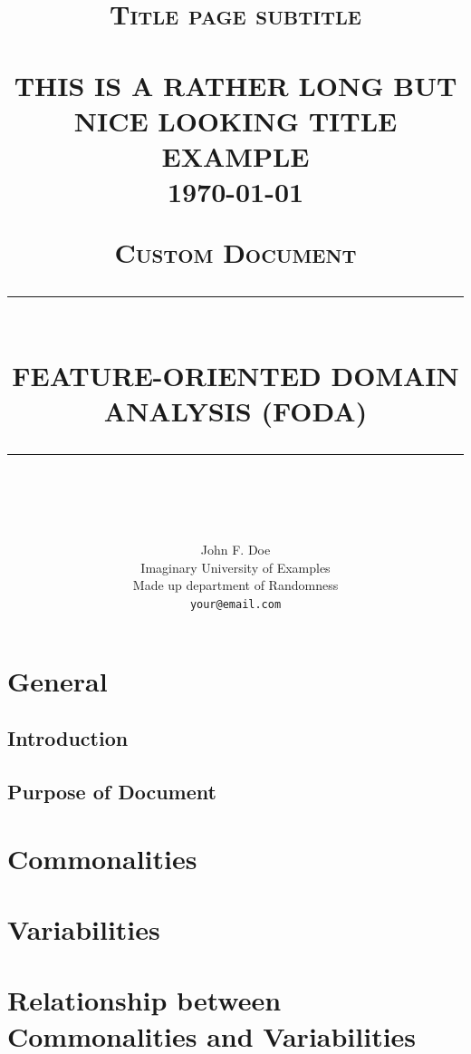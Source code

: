 \documentclass[12pt, titlepage] {article}
\title{	\normalsize \textsc{Title page subtitle} 	%
		 	\\[2.0cm]								%
			\HRule{0.5pt} \\						%
			\LARGE \textbf{\uppercase{This is a rather long but nice looking title example}}	%
			\HRule{2pt} \\ [0.5cm]		%
			\normalsize \today			%
		}
\author{
		John F. Doe\\	
		Imaginary University of Examples\\	
		Made up department of Randomness\\
        \texttt{your@email.com} \\
}
\newcommand{\HRule}[1]{\rule{\linewidth}{#1}} 	%
\newcounter{com}
\begin{document}
\title{	\normalsize \textsc{Custom Document} 	%
    \\[2.0cm]								%
    \HRule{0.5pt} \\						%
    \LARGE \textbf{\uppercase{Feature-Oriented Domain Analysis (FODA)}}	%
    \HRule{2pt} \\ [0.5cm]		%
}
\author{\authname}
\thispagestyle{empty}		%


\maketitle


\tableofcontents
\listoftables

\setcounter{page}{1}		%

\newpage


\newpage{}




\newpage{}
\setcounter{page}{1}		%
\section{General}

\subsection{Introduction}

\subsection{Purpose of Document}


\newpage{}
\section{Commonalities}
\label{sec:Commonalities}


\newpage{}
\section{Variabilities}
\label{sec:Variabilities}


\newpage{}
\section{Relationship between Commonalities and Variabilities}
\label{sec:RelationshipCommonalitiesVariabilities}

\end{document}
